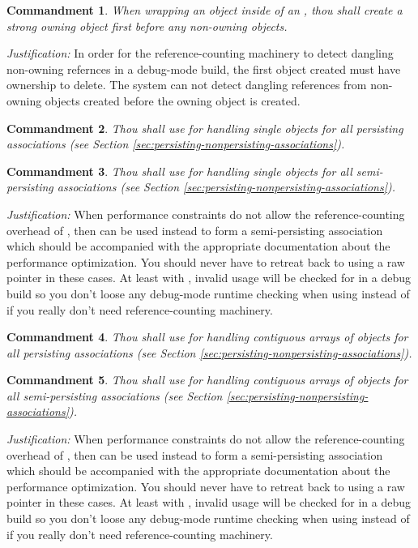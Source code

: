 \documentclass[pdf,ps2pdf,11pt]{SANDreport}
\newtheorem{commandment}{Commandment}
\begin{document}
\begin{commandment}\label{cmnd:owning-rcp-first}
When wrapping an object inside of an {}, thou shall create
a strong owning {} object first before any non-owning
{} objects.
\end{commandment}
{}\textit{Justification:} In order for the reference-counting
machinery to detect dangling non-owning refernces in a debug-mode
build, the first {} object created must have ownership to
delete.  The system can not detect dangling references from non-owning
{} objects created before the owning
{} object is created.

\begin{commandment}
Thou shall use {} for handling single objects for all
persisting associations (see Section
{}\ref{sec:persisting-nonpersisting-associations}).
\end{commandment}

\begin{commandment}\label{cmnd:ptr-semi-persisting}
Thou shall use {} for handling single objects for all
semi-persisting associations (see Section
{}\ref{sec:persisting-nonpersisting-associations}).
\end{commandment}
{}\textit{Justification:} When performance constraints do not allow
the reference-counting overhead of {}, then {}
can be used instead to form a semi-persisting association which should
be accompanied with the appropriate documentation about the
performance optimization.  You should never have to retreat back to
using a raw pointer in these cases.  At least with {},
invalid usage will be checked for in a debug build so you don't loose
any debug-mode runtime checking when using {} instead of
{} if you really don't need reference-counting machinery.

\begin{commandment}
Thou shall use {} for handling contiguous arrays of
objects for all persisting associations (see Section
{}\ref{sec:persisting-nonpersisting-associations}).
\end{commandment}

\begin{commandment}\label{cmnd:arrayview-semi-persisting}
Thou shall use {} for handling contiguous arrays of
objects for all semi-persisting associations (see Section
{}\ref{sec:persisting-nonpersisting-associations}).
\end{commandment}
{}\textit{Justification:} When performance constraints do not allow
the reference-counting overhead of {}, then
{} can be used instead to form a semi-persisting
association which should be accompanied with the appropriate
documentation about the performance optimization.  You should never
have to retreat back to using a raw pointer in these cases.  At least
with {}, invalid usage will be checked for in a
debug build so you don't loose any debug-mode runtime checking when
using {} instead of {} if you
really don't need reference-counting machinery.
\end{document}

